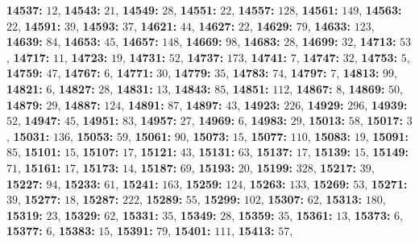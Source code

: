 \textsf{\bfseries 14537:} $12$, \textsf{\bfseries 14543:} $21$, \textsf{\bfseries 14549:} $28$, \textsf{\bfseries 14551:} $22$, \textsf{\bfseries 14557:} $128$, \textsf{\bfseries 14561:} $149$, \textsf{\bfseries 14563:} $22$, \textsf{\bfseries 14591:} $39$, \textsf{\bfseries 14593:} $37$, \textsf{\bfseries 14621:} $44$, \textsf{\bfseries 14627:} $22$, \textsf{\bfseries 14629:} $79$, \textsf{\bfseries 14633:} $123$, \textsf{\bfseries 14639:} $84$, \textsf{\bfseries 14653:} $45$, \textsf{\bfseries 14657:} $148$, \textsf{\bfseries 14669:} $98$, \textsf{\bfseries 14683:} $28$, \textsf{\bfseries 14699:} $32$, \textsf{\bfseries 14713:} $53$, \textsf{\bfseries 14717:} $11$, \textsf{\bfseries 14723:} $19$, \textsf{\bfseries 14731:} $52$, \textsf{\bfseries 14737:} $173$, \textsf{\bfseries 14741:} $7$, \textsf{\bfseries 14747:} $32$, \textsf{\bfseries 14753:} $5$, \textsf{\bfseries 14759:} $47$, \textsf{\bfseries 14767:} $6$, \textsf{\bfseries 14771:} $30$, \textsf{\bfseries 14779:} $35$, \textsf{\bfseries 14783:} $74$, \textsf{\bfseries 14797:} $7$, \textsf{\bfseries 14813:} $99$, \textsf{\bfseries 14821:} $6$, \textsf{\bfseries 14827:} $28$, \textsf{\bfseries 14831:} $13$, \textsf{\bfseries 14843:} $85$, \textsf{\bfseries 14851:} $112$, \textsf{\bfseries 14867:} $8$, \textsf{\bfseries 14869:} $50$, \textsf{\bfseries 14879:} $29$, \textsf{\bfseries 14887:} $124$, \textsf{\bfseries 14891:} $87$, \textsf{\bfseries 14897:} $43$, \textsf{\bfseries 14923:} $226$, \textsf{\bfseries 14929:} $296$, \textsf{\bfseries 14939:} $52$, \textsf{\bfseries 14947:} $45$, \textsf{\bfseries 14951:} $83$, \textsf{\bfseries 14957:} $27$, \textsf{\bfseries 14969:} $6$, \textsf{\bfseries 14983:} $29$, \textsf{\bfseries 15013:} $58$, \textsf{\bfseries 15017:} $3$, \textsf{\bfseries 15031:} $136$, \textsf{\bfseries 15053:} $59$, \textsf{\bfseries 15061:} $90$, \textsf{\bfseries 15073:} $15$, \textsf{\bfseries 15077:} $110$, \textsf{\bfseries 15083:} $19$, \textsf{\bfseries 15091:} $85$, \textsf{\bfseries 15101:} $15$, \textsf{\bfseries 15107:} $17$, \textsf{\bfseries 15121:} $43$, \textsf{\bfseries 15131:} $63$, \textsf{\bfseries 15137:} $17$, \textsf{\bfseries 15139:} $15$, \textsf{\bfseries 15149:} $71$, \textsf{\bfseries 15161:} $17$, \textsf{\bfseries 15173:} $14$, \textsf{\bfseries 15187:} $69$, \textsf{\bfseries 15193:} $20$, \textsf{\bfseries 15199:} $328$, \textsf{\bfseries 15217:} $39$, \textsf{\bfseries 15227:} $94$, \textsf{\bfseries 15233:} $61$, \textsf{\bfseries 15241:} $163$, \textsf{\bfseries 15259:} $124$, \textsf{\bfseries 15263:} $133$, \textsf{\bfseries 15269:} $53$, \textsf{\bfseries 15271:} $39$, \textsf{\bfseries 15277:} $18$, \textsf{\bfseries 15287:} $222$, \textsf{\bfseries 15289:} $55$, \textsf{\bfseries 15299:} $102$, \textsf{\bfseries 15307:} $62$, \textsf{\bfseries 15313:} $180$, \textsf{\bfseries 15319:} $23$, \textsf{\bfseries 15329:} $62$, \textsf{\bfseries 15331:} $35$, \textsf{\bfseries 15349:} $28$, \textsf{\bfseries 15359:} $35$, \textsf{\bfseries 15361:} $13$, \textsf{\bfseries 15373:} $6$, \textsf{\bfseries 15377:} $6$, \textsf{\bfseries 15383:} $15$, \textsf{\bfseries 15391:} $79$, \textsf{\bfseries 15401:} $111$, \textsf{\bfseries 15413:} $57$, 
